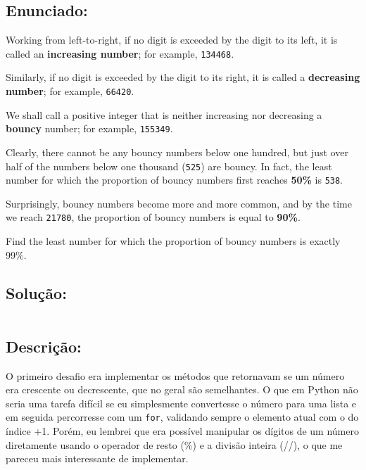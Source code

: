 \documentclass[9pt,a4paper,twocolumn,twoside]{tau-class/tau}
\begin{document}
    \subsection{Enunciado:}

        \begin{tauenv}[frametitle = Bouncy Numbers.]
                Working from left-to-right, if no digit is exceeded by the digit to its left, it is called an \textbf{increasing number}; for example, \texttt{134468}.

                Similarly, if no digit is exceeded by the digit to its right, it is called a \textbf{decreasing number}; for example, \texttt{66420}.
                
                We shall call a positive integer that is neither increasing nor decreasing a \textbf{bouncy} number; for example, \texttt{155349}.
                
                Clearly, there cannot be any bouncy numbers below one hundred, but just over half of the numbers below one thousand (\texttt{525}) are bouncy. In fact, the least number for which the proportion of bouncy numbers first reaches \textbf{50\%} is \texttt{538}.
                
                Surprisingly, bouncy numbers become more and more common, and by the time we reach \texttt{21780}, the proportion of bouncy numbers is equal to \textbf{90\%}.
                
                Find the least number for which the proportion of bouncy numbers is exactly 99\%.
        \end{tauenv}

    \subsection{Solução:}

        \inputminted{python}{src/11/11.py}

    \subsection{Descrição:}

        O primeiro desafio era implementar os métodos que retornavam se um número era crescente ou decrescente, que no geral são semelhantes. O que em Python não seria uma tarefa difícil se eu simplesmente convertesse o número para uma lista e em seguida percorresse com um \texttt{for}, validando sempre o elemento atual com o do índice +1. Porém, eu lembrei que era possível manipular os dígitos de um número diretamente usando o operador de resto (\%) e a divisão inteira (//), o que me pareceu mais interessante de implementar. 
\end{document}
